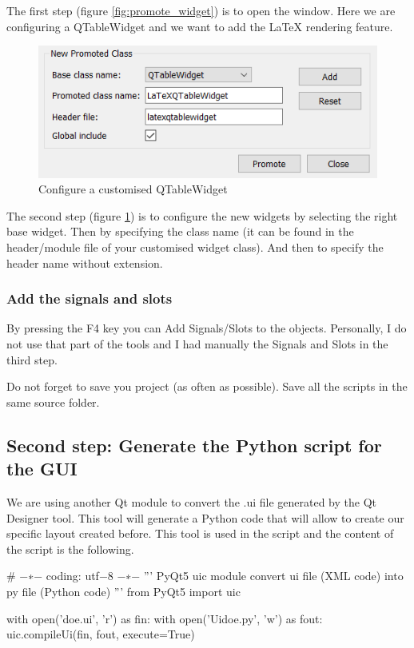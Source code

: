 \documentclass[english, 12 pt, openany, oneside]{book}
\begin{document}
The first step (figure \ref{fig:promote_widget}) is to open the  window. Here we are configuring a QTableWidget and we want to add the LaTeX rendering feature.

\begin{figure}[!ht]
\centering
\includegraphics[width=0.6\linewidth]{config_promote}
\caption{Configure a customised QTableWidget\label{fig:config_promote}}
\end{figure}

The second step (figure \ref{fig:config_promote}) is to configure the new widgets by selecting the right base widget. Then by specifying the class name (it can be found in the header/module file of your customised widget class). And then to specify the header name without extension.

\subsubsection{Add the signals and slots}
By pressing the F4 key you can Add Signals/Slots to the objects. Personally, I do not use that part of the tools and I had manually the Signals and Slots in the third step.

Do not forget to save you project (as often as possible). Save all the scripts in the same source folder.

\subsection{Second step: Generate the Python script for the GUI}
We are using another Qt module to convert the .ui file generated by the Qt Designer tool. This tool will generate a Python code that will allow to create our specific layout created before. This tool is used in the  script and the content of the script is the following.

\begin{pyverbatim}
# −∗− coding: utf−8 −∗−
''' PyQt5 uic module convert ui file (XML code) into py file (Python code) '''
from PyQt5 import uic

with open('doe.ui', 'r') as fin:
    with open('Uidoe.py', 'w') as fout:
        uic.compileUi(fin, fout, execute=True)
\end{pyverbatim}
\end{document}
